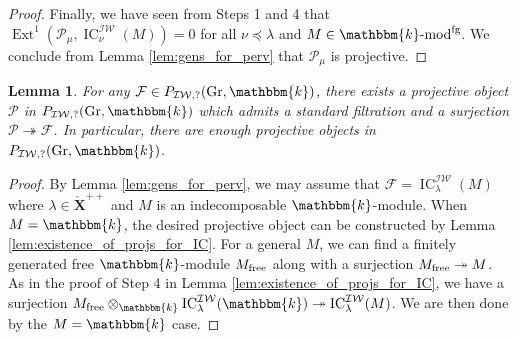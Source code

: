 \documentclass{amsart}
\renewcommand{\k}{\mathbbm{k}}
\newcommand{\scrF}{\mathcal{F}}
\newcommand{\scrP}{\mathcal{P}}
\newcommand{\bfXv}{\check{\mathbf{X}}}
\newcommand{\IW}{\mathcal{IW}}
\DeclareMathOperator{\Ext}{Ext}
\renewcommand{\mod}[1]{#1\textnormal{-mod}}
\DeclareMathOperator{\IC}{IC}
\DeclareMathOperator{\Gr}{Gr}
\DeclareMathOperator{\fg}{fg}
\newtheorem{lemma}[subsubsection]{Lemma}
\theoremstyle{definition}
\begin{document}
\begin{proof}
Finally, we have seen from Steps 1 and 4 that $\Ext^1 (\scrP_{\mu}, \IC_{\nu}^{\IW} (M)) = 0$ for all $\nu \preceq \lambda$ and $M \in \mod{\k}^{\fg}$. We conclude from Lemma \ref{lem:gens_for_perv} that $\scrP_{\mu}$ is projective.
    \end{proof}

    \begin{lemma}\label{lem:enough_projectives}
        For any $\scrF \in P_{\IW, ?} (\Gr, \k)$, there exists a projective object $\scrP$ in $P_{\IW, ?} (\Gr, \k)$ which admits a standard filtration and a surjection $\scrP \twoheadrightarrow \scrF$.
        In particular, there are enough projective objects in $P_{\IW, ?} (\Gr, \k)$.
    \end{lemma}
    \begin{proof}
        By Lemma \ref{lem:gens_for_perv}, we may assume that $\scrF = \IC_{\lambda}^{\IW} (M)$ where $\lambda \in \bfXv^{++}$ and $M$ is an indecomposable $\k$-module.
        When $M = \k$, the desired projective object can be constructed by Lemma \ref{lem:existence_of_projs_for_IC}.
        For a general $M$, we can find a finitely generated free $\k$-module $M_{\textnormal{free}}$ along with a surjection $M_{\textnormal{free}} \twoheadrightarrow M$. 
        As in the proof of Step 4 in Lemma \ref{lem:existence_of_projs_for_IC}, we have a surjection $M_{\textnormal{free}} \otimes_{\k} \IC_{\lambda}^{\IW} (\k) \twoheadrightarrow \IC_{\lambda}^{\IW} (M)$.
        We are then done by the $M = \k$ case.
    \end{proof}
\end{document}
